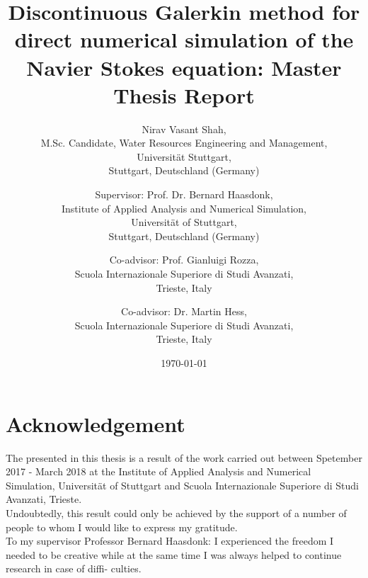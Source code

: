 \documentclass[a4paper]{book}
\begin{document}
\begin{center}

\title{Discontinuous Galerkin method for direct numerical simulation of the Navier Stokes equation: Master Thesis Report}


\author{Nirav Vasant Shah, \\M.Sc. Candidate, Water Resources Engineering and Management, \\Universit\"at Stuttgart, \\Stuttgart, Deutschland (Germany)\\ 
\and Supervisor: Prof. Dr. Bernard Haasdonk,\\ Institute of Applied Analysis and Numerical Simulation, \\Universit\"at of Stuttgart,\\ Stuttgart, Deutschland (Germany)\\ \and Co-advisor: Prof. Gianluigi Rozza,\\ Scuola Internazionale Superiore di Studi Avanzati, \\Trieste, Italy \\ \and Co-advisor: Dr. Martin Hess,\\ Scuola Internazionale Superiore di Studi Avanzati, \\Trieste, Italy }
\date{\today}
\maketitle

\end{center}

\section{Acknowledgement}

The  presented in this thesis is a result of the work carried out between Spetember 2017 - March 2018 at the Institute of Applied Analysis and Numerical Simulation, Universit\"at of Stuttgart and Scuola Internazionale Superiore di Studi Avanzati, Trieste. \\

Undoubtedly, this result could only be achieved by the support of a number of people to whom I would
like to express my gratitude.\\

To my supervisor Professor Bernard Haasdonk: I experienced the freedom I needed to be
creative while at the same time I was always helped to continue research in case of diffi-
culties. \\
\end{document}
